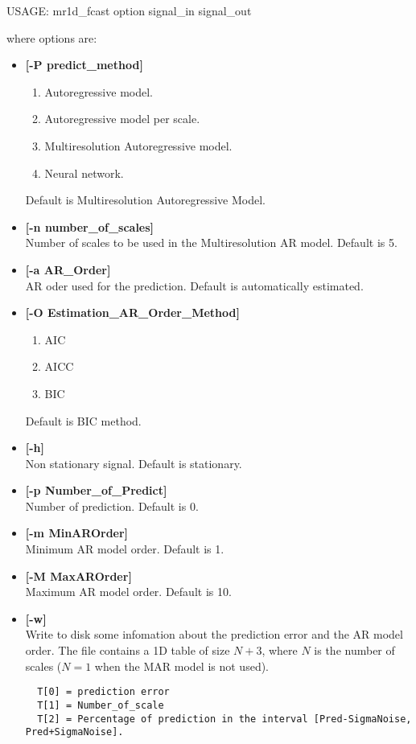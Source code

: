 {\bf
\begin{center}
 USAGE: mr1d\_fcast option signal\_in  signal\_out
\end{center}}
where options are:
\begin{itemize}
\item {\bf [-P predict\_method]}
{\small
\begin{enumerate}
\baselineskip=0.4truecm
\item  Autoregressive model.
\item  Autoregressive model per scale. 
\item  Multiresolution Autoregressive model.
\item  Neural network.
\end{enumerate}
}
Default is Multiresolution Autoregressive Model.
\item {\bf [-n number\_of\_scales]} \\
Number of scales to be used in the Multiresolution AR model. Default is 5.
\item {\bf [-a AR\_Order]} \\
AR oder used for the prediction. Default is automatically estimated.
\item {\bf [-O Estimation\_AR\_Order\_Method]}
{\small
\begin{enumerate}
\item AIC 
\item AICC
\item BIC
\end{enumerate}}
Default is BIC method.
\item {\bf[-h]} \\
Non stationary signal. Default is stationary.
\item {\bf[-p Number\_of\_Predict]} \\
Number of prediction. Default is 0.
\item {\bf[-m MinAROrder]} \\
Minimum AR model order. Default is 1.
\item {\bf[-M MaxAROrder]} \\
Maximum AR model order. Default is 10.
\item {\bf[-w]} \\
Write to disk some infomation about the prediction error and the
 AR model order. 
The file contains a 1D table 
of size $N+3$, where $N$ is the number of scales ($N = 1$ when the 
MAR model is not used).
\begin{verbatim}
  T[0] = prediction error
  T[1] = Number_of_scale 
  T[2] = Percentage of prediction in the interval [Pred-SigmaNoise, Pred+SigmaNoise]. 

\end{verbatim}
\end{itemize}
